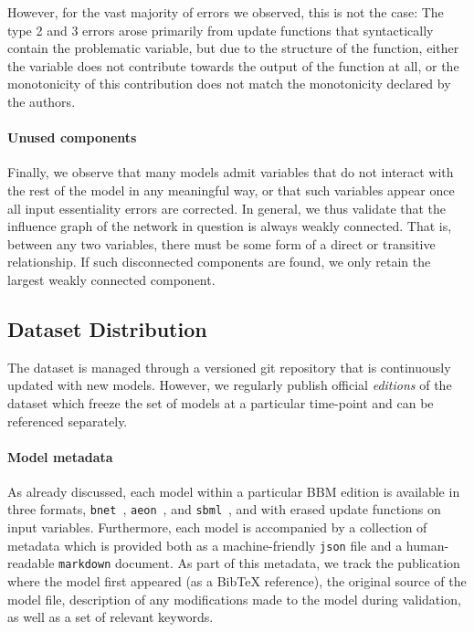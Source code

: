 \documentclass[fleqn,10pt]{wlscirep}
\begin{document}
However, for the vast majority of errors we observed, this is not the case: The type 2 and 3 errors arose primarily from update functions that syntactically contain the problematic variable, but due to the structure of the function, either the variable does not contribute towards the output of the function at all, or the monotonicity of this contribution does not match the monotonicity declared by the authors.

\paragraph*{Unused components}

Finally, we observe that many models admit variables that do not interact with the rest of the model in any meaningful way, or that such variables appear once all input essentiality errors are corrected. In general, we thus validate that the influence graph of the network in question is always weakly connected. That is, between any two variables, there must be some form of a direct or transitive relationship. If such disconnected components are found, we only retain the largest weakly connected component.

\subsection*{Dataset Distribution}

The dataset is managed through a versioned git repository that is continuously updated with new models. However, we regularly publish official \emph{editions} of the dataset which freeze the set of models at a particular time-point and can be referenced separately.

\paragraph*{Model metadata} 

As already discussed, each model within a particular BBM edition is available in three formats, \texttt{bnet}~\cite{pyboolnet}, \texttt{aeon}~\cite{aeon}, and \texttt{sbml}~\cite{sbml-qual}, and with erased update functions on input variables. Furthermore, each model is accompanied by a collection of metadata which is provided both as a machine-friendly \texttt{json} file and a human-readable \texttt{markdown} document. As part of this metadata, we track the publication where the model first appeared (as a BibTeX reference), the original source of the model file, description of any modifications made to the model during validation, as well as a set of relevant keywords.
\end{document}
